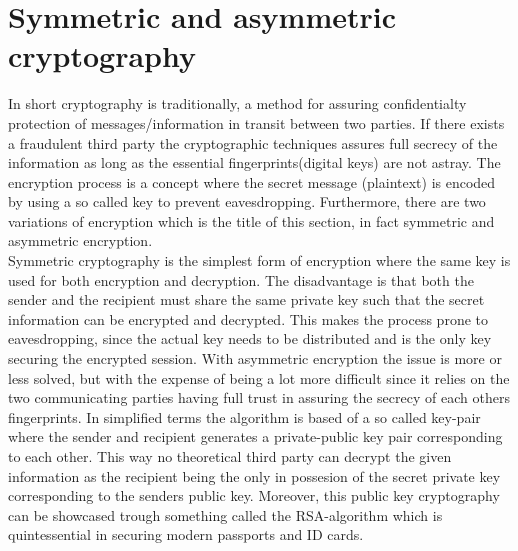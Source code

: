 \documentclass[12pt,
               a4paper,
               article,
               oneside,
               oldfontcommands,
               english]{memoir}
\begin{document}
\section*{Symmetric and asymmetric cryptography}
In short cryptography is traditionally, a method  for assuring confidentialty protection of messages/information in transit between two parties. If there exists a fraudulent third party the cryptographic techniques assures full secrecy of the information as long as the essential fingerprints(digital keys) are not astray. The encryption process is a concept where the secret message (plaintext) is encoded by using a so called key to prevent eavesdropping. Furthermore, there are two variations of encryption which is the title of this section, in fact symmetric and asymmetric encryption. \vspace{4mm}\\
Symmetric cryptography is the simplest form of encryption where the same key is used for both encryption and decryption. The disadvantage  is that both the sender and the recipient must share the same private key such that the secret information can be encrypted and decrypted. This makes the process prone to eavesdropping, since the actual key needs to be distributed and is the only key securing the encrypted session. With asymmetric encryption the issue is more or less solved, but with the expense of being a lot more difficult since it relies on the two communicating parties having full trust in assuring the secrecy of each others fingerprints. In simplified terms the algorithm is based of a so called key-pair where the sender and recipient generates a private-public key pair corresponding to each other. This way no theoretical third party can decrypt the given information as the recipient being the only in possesion of the secret private key corresponding to the senders public key. Moreover, this public key cryptography can be showcased trough something called the RSA-algorithm which is quintessential in securing modern passports and ID cards. \vspace{4mm}\\
\end{document}
